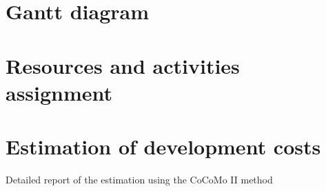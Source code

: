
\section{Gantt diagram}

\section{Resources and activities assignment}

\section{Estimation of development costs}

\begin{table}[hbtp]
\centering

\caption{Detailed report of the estimation using the CoCoMo II method}
\label{tblCocomoDetail}
\end{table}

